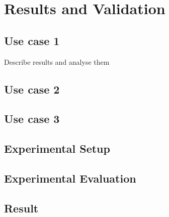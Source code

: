
\chapter{Results and Validation}

\section{Use case 1}
Describe results and analyse them

\section{Use case 2}

\section{Use case 3}

\section{Experimental Setup}
\section{Experimental Evaluation}
\section{Result}

